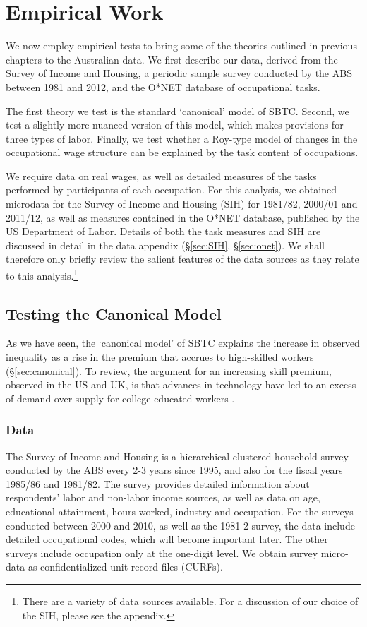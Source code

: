 \chapter{Empirical Work}\label{ch:4}

We now employ empirical tests to bring some of the theories outlined in previous chapters to the Australian data. We first describe our data, derived from the Survey of Income and Housing, a periodic sample survey conducted by the ABS between 1981 and 2012, and the O*NET database of occupational tasks.

The first theory we test is the standard `canonical' model of SBTC. Second, we test a slightly more nuanced version of this model, which makes provisions for three types of labor. Finally, we test whether a Roy-type model of changes in the occupational wage structure can be explained by the task content of occupations.

We require data on real wages, as well as detailed measures of the tasks performed by participants of each occupation. For this analysis, we obtained microdata for the Survey of Income and Housing (SIH) for 1981/82, 2000/01 and 2011/12, as well as measures contained in the O*NET database, published by the US Department of Labor. Details of both the task measures and SIH are discussed in detail in the data appendix (\S\ref{sec:SIH}, \S\ref{sec:onet}). We shall therefore only briefly review the salient features of the data sources as they relate to this analysis.\footnote{There are a variety of data sources available. For a discussion of our choice of the SIH, please see the appendix.}

\section{Testing the Canonical Model}\label{sec:testsbtc}

As we have seen, the `canonical model' of SBTC explains the increase in observed inequality as a rise in the premium that accrues to high-skilled workers (\S\ref{sec:canonical}). To review, the argument for an increasing skill premium, observed in the US and UK, is that advances in technology have led to an excess of demand over supply for college-educated workers \citep{Katz1992}.

\subsection{Data}

The Survey of Income and Housing is a hierarchical clustered household survey conducted by the ABS every 2-3 years since 1995, and also for the fiscal years 1985/86 and 1981/82. The survey provides detailed  information about respondents' labor and non-labor income sources, as well as data on age, educational attainment, hours worked, industry and occupation. For the surveys conducted between 2000 and 2010, as well as the 1981-2 survey, the data include detailed occupational codes, which will become important later. The other surveys include occupation only at the one-digit level. We obtain survey micro-data as confidentialized unit record files (CURFs).

